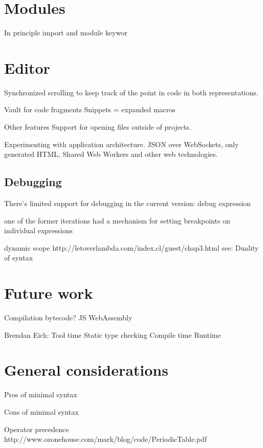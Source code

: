 \section{Modules}
In principle
import and module keywor


\section{Editor}
Synchronized scrolling to keep track of the point in code in both representations.

Vault for code fragments
Snippets = expanded macros

Other features
Support for opening files outside of projects.

Experimenting with application architecture. JSON over WebSockets, only generated HTML, Shared Web Workers and other web technologies.


\subsection{Debugging}

There's limited support for debugging in the current version:
debug expression

one of the former iterations had a mechanism for setting breakpoints on individual expressions


dynamic scope
http://letoverlambda.com/index.cl/guest/chap3.html
see: Duality of syntax

\section{Future work}
Compilation
    bytecode?
    JS
    WebAssembly

Brendan Eich:
Tool time
    Static type checking
Compile time
Runtime

\section{General considerations}

Pros of minimal syntax

Cons of minimal syntax

Operator precedence
http://www.ozonehouse.com/mark/blog/code/PeriodicTable.pdf
